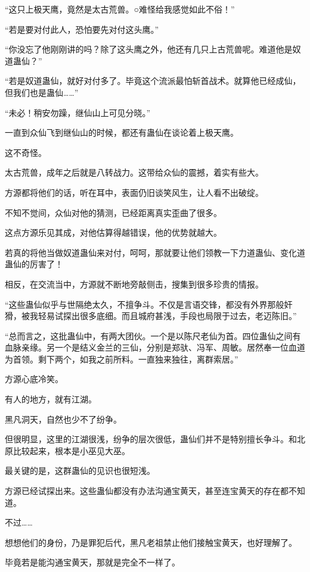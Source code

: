 
\begin{this_body}

“这只上极天鹰，竟然是太古荒兽。○难怪给我感觉如此不俗！”

“若是要对付此人，恐怕要先对付这头鹰。”

“你没忘了他刚刚讲的吗？除了这头鹰之外，他还有几只上古荒兽呢。难道他是奴道蛊仙？”

“若是奴道蛊仙，就好对付多了。毕竟这个流派最怕斩首战术。就算他已经成仙，但我们也是蛊仙……”

“未必！稍安勿躁，继仙山上可见分晓。”

一直到众仙飞到继仙山的时候，都还有蛊仙在谈论着上极天鹰。

这不奇怪。

太古荒兽，成年之后就是八转战力。这带给众仙的震撼，着实有些大。

方源都将他们的话，听在耳中，表面仍旧谈笑风生，让人看不出破绽。

不知不觉间，众仙对他的猜测，已经距离真实歪曲了很多。

这点方源乐见其成，对他估算得越错误，他的优势就越大。

若真的将他当做奴道蛊仙来对付，呵呵，那就要让他们领教一下力道蛊仙、变化道蛊仙的厉害了！

相反，在交流当中，方源就不断地旁敲侧击，搜集到很多珍贵的情报。

“这些蛊仙似乎与世隔绝太久，不擅争斗。不仅是言语交锋，都没有外界那般奸猾，被我轻易试探出很多底细。而且城府甚浅，手段也局限于过去，老迈陈旧。”

“总而言之，这批蛊仙中，有两大团伙。一个是以陈尺老仙为首。四位蛊仙之间有血脉亲缘。另一个是结义金兰的三仙，分别是郑驮、冯军、周敏。居然奉一位血道为首领。剩下两个，如我之前所料。一直独来独往，离群索居。”

方源心底冷笑。

有人的地方，就有江湖。

黑凡洞天，自然也少不了纷争。

但很明显，这里的江湖很浅，纷争的层次很低，蛊仙们并不是特别擅长争斗。和北原比较起来，根本是小巫见大巫。

最关键的是，这群蛊仙的见识也很短浅。

方源已经试探出来。这些蛊仙都没有办法沟通宝黄天，甚至连宝黄天的存在都不知道。

不过……

想想他们的身份，乃是罪犯后代，黑凡老祖禁止他们接触宝黄天，也好理解了。

毕竟若是能沟通宝黄天，那就是完全不一样了。


\end{this_body}
